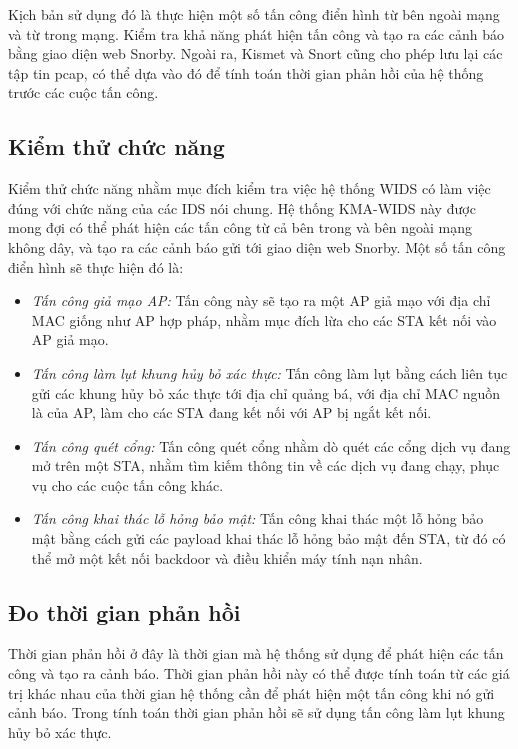 Kịch bản sử dụng đó là thực hiện một số tấn công điển hình từ bên ngoài mạng và từ trong mạng. Kiểm tra khả năng phát hiện tấn công và tạo ra các cảnh báo bằng giao diện web Snorby. Ngoài ra, Kismet và Snort cũng cho phép lưu lại các tập tin pcap, có thể dựa vào đó để tính toán thời gian phản hồi của hệ thống trước các cuộc tấn công.

\subsection{Kiểm thử chức năng}
Kiểm thử chức năng nhằm mục đích kiểm tra việc hệ thống WIDS có làm việc đúng với chức năng của các IDS nói chung. Hệ thống KMA-WIDS này được mong đợi có thể phát hiện các tấn công từ cả bên trong và bên ngoài mạng không dây, và tạo ra các cảnh báo gửi tới giao diện web Snorby. Một số tấn công điển hình sẽ thực hiện đó là:

\begin{itemize}
\item \emph{Tấn công giả mạo AP:} Tấn công này sẽ tạo ra một AP giả mạo với địa chỉ MAC giống như AP hợp pháp, nhằm mục đích lừa cho các STA kết nối vào AP giả mạo.
\item \emph{Tấn công làm lụt khung hủy bỏ xác thực:} Tấn công làm lụt bằng cách liên tục gửi các khung hủy bỏ xác thực tới địa chỉ quảng bá, với địa chỉ MAC nguồn là của AP, làm cho các STA đang kết nối với AP bị ngắt kết nối.
\item \emph{Tấn công quét cổng:} Tấn công quét cổng nhằm dò quét các cổng dịch vụ đang mở trên một STA, nhằm tìm kiếm thông tin về các dịch vụ đang chạy, phục vụ cho các cuộc tấn công khác.
\item \emph{Tấn công khai thác lỗ hỏng bảo mật:} Tấn công khai thác một lỗ hỏng bảo mật bằng cách gửi các payload khai thác lỗ hỏng bảo mật đến STA, từ đó có thể mở một kết nối backdoor và điều khiển máy tính nạn nhân.
\end{itemize}

\subsection{Đo thời gian phản hồi}
Thời gian phản hồi ở đây là thời gian mà hệ thống sử dụng để phát hiện các tấn công và tạo ra cảnh báo. Thời gian phản hồi này có thể được tính toán từ các giá trị khác nhau của thời gian hệ thống cần để phát hiện một tấn công khi nó gửi cảnh báo. Trong tính toán thời gian phản hồi sẽ sử dụng tấn công làm lụt khung hủy bỏ xác thực.

